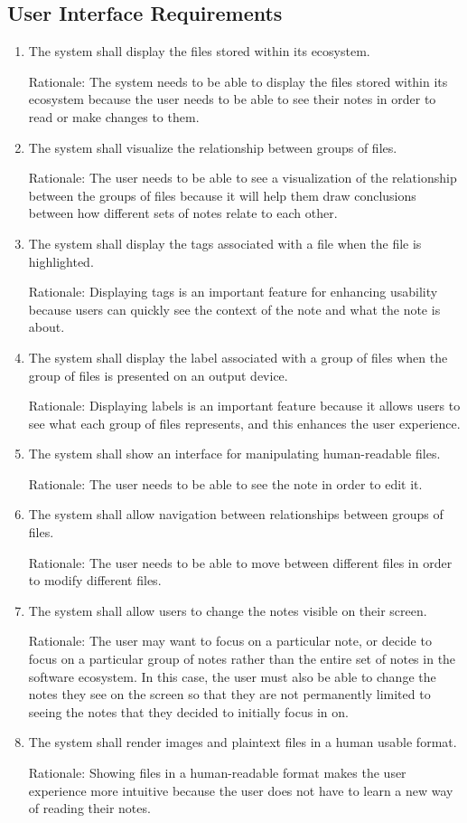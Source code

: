 \documentclass{article}
\begin{document}
\subsection{User Interface Requirements}
\begin{enumerate}[U{I}R1]
    \item The system shall display the files stored within its ecosystem.

	Rationale: The system needs to be able to display the files stored within its ecosystem because the user needs to be able to see their notes in order to read or make changes to them.
    \item The system shall visualize the relationship between groups of files.

	Rationale: The user needs to be able to see a visualization of the relationship between the groups of files because it will help them draw conclusions between how different sets of notes relate to each other.
	\item The system shall display the tags associated with a file when the file is highlighted.

	Rationale: Displaying tags is an important feature for enhancing usability because users can quickly see the context of the note and what the note is about.
	\item The system shall display the label associated with a group of files when the group of files is presented on an output device.

	Rationale: Displaying labels is an important feature because it allows users to see what each group of files represents, and this enhances the user experience.
    \item The system shall show an interface for manipulating human-readable files.

	Rationale: The user needs to be able to see the note in order to edit it.
    \item The system shall allow navigation between relationships between groups of files.

	Rationale: The user needs to be able to move between different files in order to modify different files.
    \item The system shall allow users to change the notes visible on their screen.

	Rationale: The user may want to focus on a particular note, or decide to focus on a particular group of notes rather than the entire set of notes in the software ecosystem. In this case, the user must also be able to change the notes they see on the screen so that they are not permanently limited to seeing the notes that they decided to initially focus in on.
    \item The system shall render images and plaintext files in a human usable format.

	Rationale: Showing files in a human-readable format makes the user experience more intuitive because the user does not have to learn a new way of reading their notes.
\end{enumerate}
\end{document}
